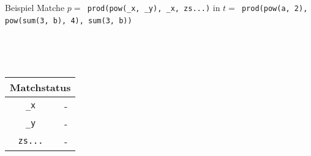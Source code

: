\begin{frame}{Beispiel}
	Matche $p =$\verb~ prod(pow(_x, _y), _x, zs...)~ in 
	$t =$\verb~ prod(pow(a, 2), pow(sum(3, b), 4), sum(3, b))~
	~\\
	\begin{columns}[c] %
		\scriptsize
        \begin{column}{0.3\textwidth}	
			~\\~\\
			\begin{tabular} {c|c}
			\multicolumn{2}{c}{Matchstatus}\\
			\hline
			\verb~_x~      & -            \\
			\verb~_y~      & -            \\
			\verb~zs...~   & -            
			\end{tabular}
        \end{column}
		
        \begin{column}{0.3\textwidth}	
        \end{column}
	\end{columns}
\end{frame}

